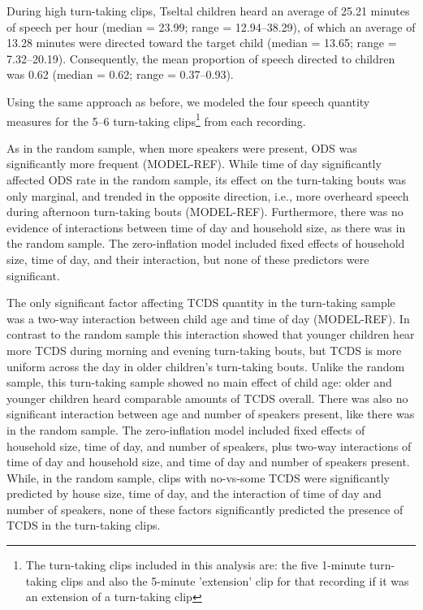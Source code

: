 \documentclass[floatsintext,man]{apa6}
\theoremstyle{definition}
\theoremstyle{definition}
\theoremstyle{definition}
\theoremstyle{remark}
\begin{document}
During high turn-taking clips, Tseltal children heard an average of
25.21 minutes of speech per hour (median = 23.99; range = 12.94--38.29),
of which an average of 13.28 minutes were directed toward the target
child (median = 13.65; range = 7.32--20.19). Consequently, the mean
proportion of speech directed to children was 0.62 (median = 0.62; range
= 0.37--0.93).

Using the same approach as before, we modeled the four speech quantity
measures for the 5--6 turn-taking
clips\footnote{The turn-taking clips included in this analysis are: the five 1-minute turn-taking clips and also the 5-minute 'extension' clip for that recording if it was an extension of a turn-taking clip}
from each recording.

As in the random sample, when more speakers were present, ODS was
significantly more frequent (MODEL-REF). While time of day significantly
affected ODS rate in the random sample, its effect on the turn-taking
bouts was only marginal, and trended in the opposite direction, i.e.,
more overheard speech during afternoon turn-taking bouts (MODEL-REF).
Furthermore, there was no evidence of interactions between time of day
and household size, as there was in the random sample. The
zero-inflation model included fixed effects of household size, time of
day, and their interaction, but none of these predictors were
significant.

The only significant factor affecting TCDS quantity in the turn-taking
sample was a two-way interaction between child age and time of day
(MODEL-REF). In contrast to the random sample this interaction showed
that younger children hear more TCDS during morning and evening
turn-taking bouts, but TCDS is more uniform across the day in older
children's turn-taking bouts. Unlike the random sample, this turn-taking
sample showed no main effect of child age: older and younger children
heard comparable amounts of TCDS overall. There was also no significant
interaction between age and number of speakers present, like there was
in the random sample. The zero-inflation model included fixed effects of
household size, time of day, and number of speakers, plus two-way
interactions of time of day and household size, and time of day and
number of speakers present. While, in the random sample, clips with
no-vs-some TCDS were significantly predicted by house size, time of day,
and the interaction of time of day and number of speakers, none of these
factors significantly predicted the presence of TCDS in the turn-taking
clips.
\end{document}
